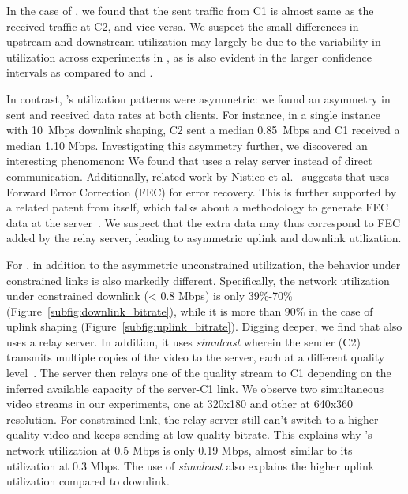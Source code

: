 In the case of \teams, we found that the sent traffic from C1
is almost same as the received traffic at C2, and vice versa. 
We suspect the small
differences in upstream and downstream utilization may largely be due to the
variability in utilization across experiments in \teams, as is
also evident in the larger confidence intervals as compared to \zoom and \meet. 

In contrast, \zoom's utilization patterns were asymmetric: we found an
asymmetry in sent and received data rates at both clients. For instance, in a
single instance with 10~Mbps downlink shaping, C2 sent a median 0.85~Mbps and
C1 received a median 1.10 Mbps. Investigating this asymmetry further, we
discovered an interesting phenomenon: We found that \zoom uses a relay server
instead of direct communication. Additionally, related work by Nistico et
al.~\cite{nistico2020comparative} suggests that \zoom uses Forward Error
Correction (FEC) for error recovery. This is further supported by a related
patent from \zoom itself, which talks about a methodology to generate FEC data
at the server~\cite{liu2019error}. We suspect that the extra data may thus
correspond to FEC added by the relay server, leading to asymmetric uplink and
downlink utilization.  

For \meet, in addition to the asymmetric unconstrained utilization, the
behavior under constrained links is also markedly different. Specifically, the
network utilization under constrained downlink (< 0.8 Mbps) is only 39\%-70\%
(Figure~\ref{subfig:downlink_bitrate}), while it is more than $90\%$ in the
case of uplink shaping (Figure~\ref{subfig:uplink_bitrate}). Digging deeper,
we find that \meet also uses a relay server. In addition, it uses
\textit{simulcast} wherein the sender (C2) transmits multiple copies of the
video to the server, each at a different quality
level~\cite{nistico2020comparative}. The server then relays one of the quality
stream to C1 depending on the inferred available capacity of the server-C1
link. We observe two simultaneous video streams in our experiments, one at
320x180 and other at 640x360 resolution. For constrained link, the relay
server still can't switch to a higher quality video and keeps sending at low
quality bitrate. This explains why \meet's network utilization at 0.5 Mbps is
only 0.19 Mbps, almost similar to its utilization at 0.3 Mbps.  The use of
\textit{simulcast} also explains the higher uplink utilization compared to
downlink. %



